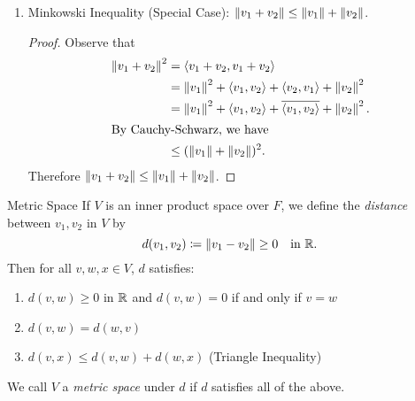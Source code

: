 \documentclass[class=article, crop=false]{standalone}
\begin{document}
\begin{theorem}{}
\begin{enumerate}[label=(\alph*)]
\begin{proof}
\begin{align*}
                          &= \norm{v_2}^2 - \frac{\tup{v_2,v_1}}{\norm{v_1}^2}\tup{v_1,v_2} \\
                          &= \norm{v_2}^2 - \frac{\overline{\tup{v_1,v_2}}}{\norm{v_1}^2}\tup{v_1,v_2} \\
                          &= \norm{v_2}^2 - \frac{\abs{\tup{v_1,v_2}}^2}{\norm{v_1}^2}.
        \end{align*}
        Rearranging, we have $\abs{\tup{v_1,v_2}}^2\leq \norm{v_1}^2\norm{v_2}^2$ so $\abs{\tup{v_1,v_2}}\leq \norm{v_1}\norm{v_2}$.
      \end{proof}
      \item Minkowski Inequality (Special Case): $\left\lVert v_1 + v_2\right\rVert\leq \left\lVert v_1\right\rVert + \left\lVert v_2\right\rVert$.
      \begin{proof}
        Observe that
        \begin{align*}
          \left\lVert v_1+v_2\right\rVert^2 &= \left\langle v_1+v_2, v_1+v_2 \right\rangle \\
                           &= \left\lVert v_1\right\rVert^2 + \left\langle v_1,v_2 \right\rangle + \left\langle v_2,v_1 \right\rangle + \left\lVert v_2\right\rVert^2 \\
                           &= \left\lVert v_1\right\rVert^2 + \left\langle v_1,v_2 \right\rangle + \overline{\left\langle v_1,v_2 \right\rangle} + \left\lVert v_2\right\rVert^2. \\
          \intertext{By Cauchy-Schwarz, we have}
                           &\leq (\left\lVert v_1\right\rVert+\left\lVert v_2\right\rVert)^2.
        \end{align*}
        Therefore $\left\lVert v_1+v_2\right\rVert\leq \left\lVert v_1\right\rVert+\left\lVert v_2\right\rVert$.
      \end{proof}
    \end{enumerate}
  \end{theorem}
  \begin{definition}{Metric Space}
    If $V$ is an inner product space over $F$, we define the \emph{distance} between $v_1, v_2$ in $V$ by
    \[
      d(v_1, v_2)\coloneqq \left\lVert v_1-v_2\right\rVert\geq 0 \quad \text{in }\mathbb{R}.
    \]
    Then for all $v, w, x\in V$, $d$ satisfies:
    \begin{enumerate}[label=(\alph*)]
      \item $d(v, w)\geq 0$ in $\mathbb{R}$ and $d(v, w) = 0$ if and only if $v = w$
      \item $d(v, w) = d(w, v)$ 
      \item $d(v, x)\leq d(v, w) + d(w, x)$ (Triangle Inequality)
    \end{enumerate}
    We call $V$ a \emph{metric space} under $d$ if $d$ satisfies all of the above.
  \end{definition}
\end{document}
